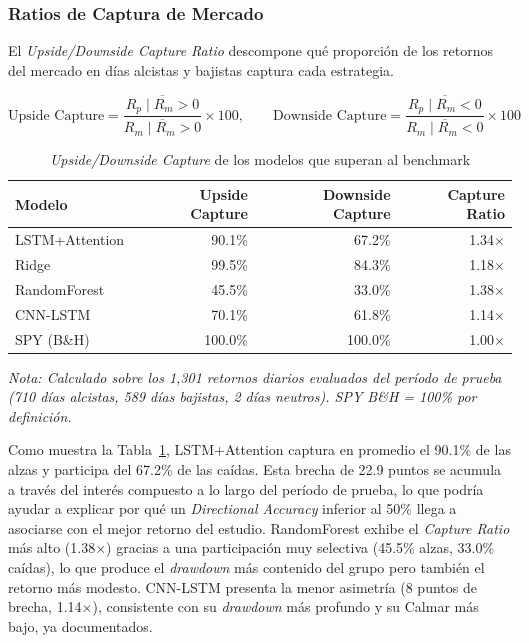 \subsubsection{Ratios de Captura de Mercado}
\label{subsec:capture_ratios}

El \textit{Upside/Downside Capture Ratio} descompone qu\'e proporci\'on de los retornos del mercado en d\'ias alcistas y bajistas captura cada estrategia.

\begin{equation}
\text{Upside Capture} = \frac{\overline{R_p \mid R_m > 0}}{\overline{R_m \mid R_m > 0}} \times 100, \qquad \text{Downside Capture} = \frac{\overline{R_p \mid R_m < 0}}{\overline{R_m \mid R_m < 0}} \times 100
\label{eq:capture}
\end{equation}

\begin{table}[htbp]
\centering
\caption{\textit{Upside/Downside Capture} de los modelos que superan al benchmark}
\label{tab:capture_ratios}
\small
\begin{tabular}{@{}lrrr@{}}
\toprule
\textbf{Modelo} & \textbf{Upside Capture} & \textbf{Downside Capture} & \textbf{Capture Ratio} \\
\midrule
LSTM+Attention & 90.1\% & 67.2\% & 1.34$\times$ \\
Ridge & 99.5\% & 84.3\% & 1.18$\times$ \\
RandomForest & 45.5\% & 33.0\% & 1.38$\times$ \\
CNN-LSTM & 70.1\% & 61.8\% & 1.14$\times$ \\
\midrule
SPY (B\&H) & 100.0\% & 100.0\% & 1.00$\times$ \\
\bottomrule
\end{tabular}
\vspace{0.2cm}
\parbox{0.9\textwidth}{\footnotesize\textit{Nota: Calculado sobre los 1{,}301 retornos diarios evaluados del per\'iodo de prueba (710 d\'ias alcistas, 589 d\'ias bajistas, 2 d\'ias neutros). SPY B\&H = 100\% por definici\'on.}}
\end{table}

Como muestra la Tabla~\ref{tab:capture_ratios}, LSTM+Attention captura en promedio el 90.1\% de las alzas y participa del 67.2\% de las ca\'idas. Esta brecha de 22.9 puntos se acumula a trav\'es del inter\'es compuesto a lo largo del per\'iodo de prueba, lo que podr\'ia ayudar a explicar por qu\'e un \textit{Directional Accuracy} inferior al 50\% llega a asociarse con el mejor retorno del estudio. RandomForest exhibe el \textit{Capture Ratio} m\'as alto (1.38$\times$) gracias a una participaci\'on muy selectiva (45.5\% alzas, 33.0\% ca\'idas), lo que produce el \textit{drawdown} m\'as contenido del grupo pero tambi\'en el retorno m\'as modesto. CNN-LSTM presenta la menor asimetr\'ia (8 puntos de brecha, 1.14$\times$), consistente con su \textit{drawdown} m\'as profundo y su Calmar m\'as bajo, ya documentados.

